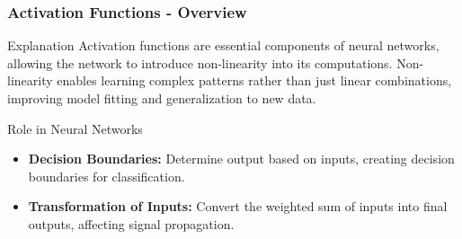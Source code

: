 \documentclass[aspectratio=169]{beamer}
\begin{document}
\begin{frame}[fragile]
  \frametitle{Activation Functions - Overview}
  \begin{block}{Explanation}
    Activation functions are essential components of neural networks, allowing the network to introduce non-linearity into its computations. Non-linearity enables learning complex patterns rather than just linear combinations, improving model fitting and generalization to new data.
  \end{block}

  \begin{block}{Role in Neural Networks}
    \begin{itemize}
      \item \textbf{Decision Boundaries:} Determine output based on inputs, creating decision boundaries for classification.
      \item \textbf{Transformation of Inputs:} Convert the weighted sum of inputs into final outputs, affecting signal propagation.
    \end{itemize}
  \end{block}
\end{frame}
\end{document}
